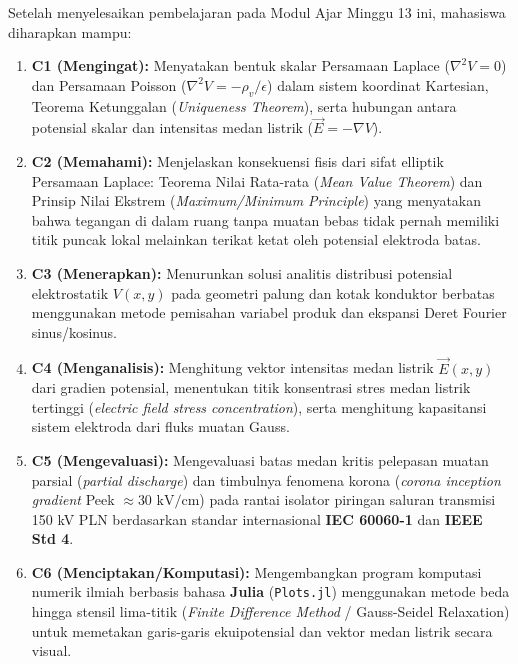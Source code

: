 \documentclass[11pt,a4paper]{article}
\theoremstyle{definition}
\begin{document}
\begin{tcolorbox}[colback=blue!5!white,colframe=headercolor,title=\textbf{Capaian Pembelajaran Khusus (Sub-CPMK 6)}]
Setelah menyelesaikan pembelajaran pada Modul Ajar Minggu 13 ini, mahasiswa diharapkan mampu:
\begin{enumerate}[leftmargin=*]
    \item \textbf{C1 (Mengingat):} Menyatakan bentuk skalar Persamaan Laplace ($\nabla^2 V = 0$) dan Persamaan Poisson ($\nabla^2 V = -\rho_v/\epsilon$) dalam sistem koordinat Kartesian, Teorema Ketunggalan (\textit{Uniqueness Theorem}), serta hubungan antara potensial skalar dan intensitas medan listrik ($\vec{E} = -\nabla V$).
    \item \textbf{C2 (Memahami):} Menjelaskan konsekuensi fisis dari sifat elliptik Persamaan Laplace: Teorema Nilai Rata-rata (\textit{Mean Value Theorem}) dan Prinsip Nilai Ekstrem (\textit{Maximum/Minimum Principle}) yang menyatakan bahwa tegangan di dalam ruang tanpa muatan bebas tidak pernah memiliki titik puncak lokal melainkan terikat ketat oleh potensial elektroda batas.
    \item \textbf{C3 (Menerapkan):} Menurunkan solusi analitis distribusi potensial elektrostatik $V(x, y)$ pada geometri palung dan kotak konduktor berbatas menggunakan metode pemisahan variabel produk dan ekspansi Deret Fourier sinus/kosinus.
    \item \textbf{C4 (Menganalisis):} Menghitung vektor intensitas medan listrik $\vec{E}(x, y)$ dari gradien potensial, menentukan titik konsentrasi stres medan listrik tertinggi (\textit{electric field stress concentration}), serta menghitung kapasitansi sistem elektroda dari fluks muatan Gauss.
    \item \textbf{C5 (Mengevaluasi):} Mengevaluasi batas medan kritis pelepasan muatan parsial (\textit{partial discharge}) dan timbulnya fenomena korona (\textit{corona inception gradient} Peek $\approx 30\text{ kV/cm}$) pada rantai isolator piringan saluran transmisi 150 kV PLN berdasarkan standar internasional \textbf{IEC 60060-1} dan \textbf{IEEE Std 4}.
    \item \textbf{C6 (Menciptakan/Komputasi):} Mengembangkan program komputasi numerik ilmiah berbasis bahasa \textbf{Julia} (\texttt{Plots.jl}) menggunakan metode beda hingga stensil lima-titik (\textit{Finite Difference Method} / Gauss-Seidel Relaxation) untuk memetakan garis-garis ekuipotensial dan vektor medan listrik secara visual.
\end{enumerate}
\end{tcolorbox}
\end{document}

